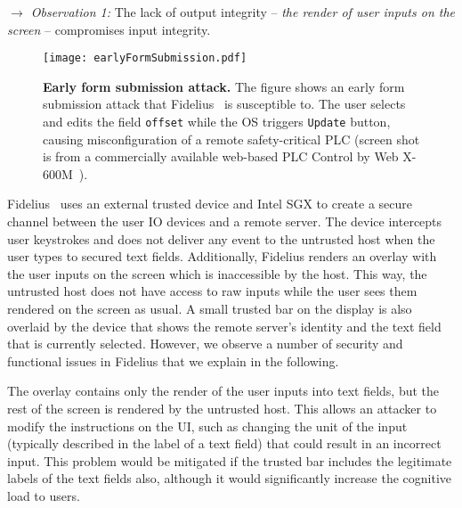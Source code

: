 \noindent\emph{$\rightarrow$ Observation 1:} The lack of output integrity -- \emph{the render of user inputs on the screen} -- compromises input integrity.

\begin{figure}[t]
\centering
\texttt{[image: earlyFormSubmission.pdf]}
\caption{\textbf{Early form submission attack.} The figure shows an early form submission attack that Fidelius~\cite{Fidelius} is susceptible to. The user selects and edits the field \texttt{offset} while the OS triggers \texttt{Update} button, causing misconfiguration of a remote safety-critical PLC (screen shot is from a commercially available web-based PLC Control by Web X-600M~\cite{controlbyweb}).}
\spacesave
\label{fig:clickJack}
\centering 
\end{figure}


Fidelius~\cite{Fidelius} uses an external trusted device and Intel SGX to create a secure channel between the user IO devices and a remote server. The device intercepts user keystrokes and does not deliver any event to the untrusted host when the user types to secured text fields. Additionally, Fidelius renders an overlay with the user inputs on the screen which is inaccessible by the host. This way, the untrusted host does not have access to raw inputs while the user sees them rendered on the screen as usual.
A small trusted bar on the display is also overlaid by the device that shows the remote server's identity and the text field that is currently selected. 
However, we observe a number of security and functional issues in Fidelius that we explain in the following.

The overlay contains only the render of the user inputs into text fields, but the rest of the screen is rendered by the untrusted host.
This allows an attacker to modify the instructions on the UI, such as changing the unit of the input (typically described in the label of a text field) that could result in an incorrect input. This problem would be mitigated if the trusted bar includes the legitimate labels of the text fields also, although it would significantly increase the cognitive load to users.

